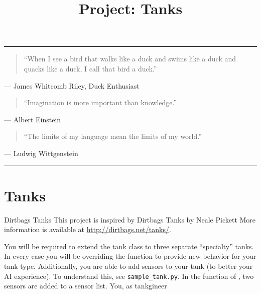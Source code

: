\documentclass[11pt]{cselabheader}
\title{Project: Tanks}
\begin{document}
\maketitle

\hrule

\begin{quotation}
  ``When I see a bird that walks like a duck and swims like a duck and quacks like
  a duck, I call that bird a duck.''
\end{quotation}
\begin{flushright}
  --- James Whitcomb Riley, Duck Enthusiast
\end{flushright}

\begin{quotation}
``Imagination is more important than knowledge.''
\end{quotation}
\begin{flushright}
  --- Albert Einstein
\end{flushright}

\begin{quotation}
``The limits of my language mean the limits of my world.''
\end{quotation}
\begin{flushright}
  --- Ludwig Wittgenstein
\end{flushright}

\hrule


\section{Tanks}

\begin{warningbox}{Dirtbags Tanks}
  This project is inspired by Dirtbags Tanks by Neale Pickett
  More information is available at \url{http://dirtbags.net/tanks/}.
\end{warningbox}

You will be required to extend the tank class to three separate
``specialty'' tanks. In every case you will be overriding the
 function to provide new behavior for your tank
type. Additionally, you are able to add sensors to your tank (to
better your AI experience). To understand this, see
\texttt{sample_tank.py}. In the  function of
, two sensors are added to a sensor list. You, as
tankgineer

\begin{ex}

\end{ex}
\end{document}
